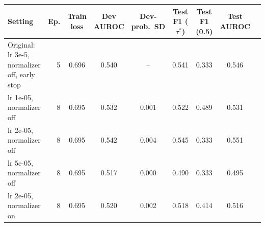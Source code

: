 \begin{tabular}{@{}lrccccccc@{}}
\toprule
Setting & Ep. & Train loss & Dev AUROC & Dev-prob.\ SD & Test F1 ($\tau^*$) & Test F1 (0.5) & Test AUROC \\
\midrule
Original: lr 3e-5, normalizer off, early stop & 5 & 0.696 & 0.540 & -- & 0.541 & 0.333 & 0.546 \\
lr 1e-05, normalizer off & 8 & 0.695 & 0.532 & 0.001 & 0.522 & 0.489 & 0.531 \\
lr 2e-05, normalizer off & 8 & 0.695 & 0.542 & 0.004 & 0.545 & 0.333 & 0.551 \\
lr 5e-05, normalizer off & 8 & 0.695 & 0.517 & 0.000 & 0.490 & 0.333 & 0.495 \\
lr 2e-05, normalizer on & 8 & 0.695 & 0.520 & 0.002 & 0.518 & 0.414 & 0.516 \\
\bottomrule
\end{tabular}